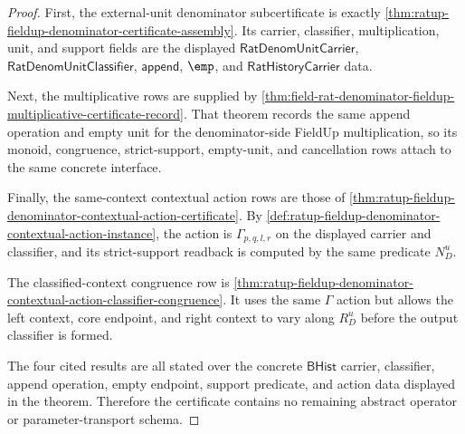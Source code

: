 \begin{proof}
First, the external-unit denominator subcertificate is exactly
\autoref{thm:ratup-fieldup-denominator-certificate-assembly}. Its carrier,
classifier, multiplication, unit, and support fields are the displayed
$\mathsf{RatDenomUnitCarrier}$, $\mathsf{RatDenomUnitClassifier}$,
$\mathsf{append}$, $\emp$, and $\mathsf{RatHistoryCarrier}$ data.

Next, the multiplicative rows are supplied by
\autoref{thm:field-rat-denominator-fieldup-multiplicative-certificate-record}.
That theorem records the same append operation and empty unit for the
denominator-side FieldUp multiplication, so its monoid, congruence,
strict-support, empty-unit, and cancellation rows attach to the same concrete
interface.

Finally, the same-context contextual action rows are those of
\autoref{thm:ratup-fieldup-denominator-contextual-action-certificate}. By
\autoref{def:ratup-fieldup-denominator-contextual-action-instance}, the action
is $\Gamma_{p,q,l,r}$ on the displayed carrier and classifier, and its
strict-support readback is computed by the same predicate $N_D^u$.

The classified-context congruence row is
\autoref{thm:ratup-fieldup-denominator-contextual-action-classifier-congruence}.
It uses the same $\Gamma$ action but allows the left context, core endpoint, and
right context to vary along $R_D^u$ before the output classifier is formed.

The four cited results are all stated over the concrete
$\mathsf{BHist}$ carrier, classifier, append operation, empty endpoint, support
predicate, and action data displayed in the theorem. Therefore the certificate
contains no remaining abstract operator or parameter-transport schema.
\end{proof}
